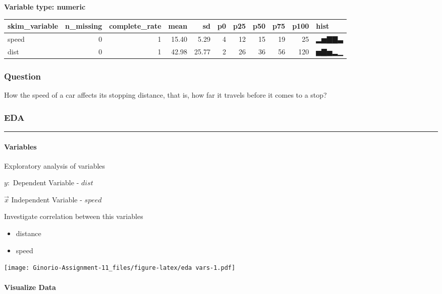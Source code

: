\documentclass[
]{article}
\providecommand{\tightlist}{%
  \setlength{\itemsep}{0pt}\setlength{\parskip}{0pt}}
\begin{document}
\textbf{Variable type: numeric}

\begin{longtable}[]{@{}lrrrrrrrrrl@{}}
\toprule
skim\_variable & n\_missing & complete\_rate & mean & sd & p0 & p25 &
p50 & p75 & p100 & hist \\
\midrule
\endhead
speed & 0 & 1 & 15.40 & 5.29 & 4 & 12 & 15 & 19 & 25 & ▂▅▇▇▃ \\
dist & 0 & 1 & 42.98 & 25.77 & 2 & 26 & 36 & 56 & 120 & ▅▇▅▂▁ \\
\bottomrule
\end{longtable}

\hypertarget{question}{%
\subsubsection{Question}\label{question}}

How the speed of a car affects its stopping distance, that is, how far
it travels before it comes to a stop?

\hypertarget{eda}{%
\subsubsection{EDA}\label{eda}}

\begin{center}\rule{0.5\linewidth}{0.5pt}\end{center}

\hypertarget{variables}{%
\paragraph{Variables}\label{variables}}

Exploratory analysis of variables

\(y:\) Dependent Variable - \(dist\)

\(\vec{x}\) Independent Variable - \(speed\)

Investigate correlation between this variables

\begin{itemize}
\tightlist
\item
  distance
\item
  speed
\end{itemize}

\texttt{[image: Ginorio-Assignment-11\_files/figure-latex/eda vars-1.pdf]}

\hypertarget{visualize-data}{%
\paragraph{Visualize Data}\label{visualize-data}}
\end{document}
